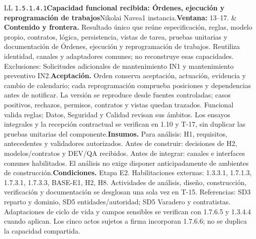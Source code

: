 \begin{longtable}{L{\tabcolsep\relax}L{\tabcolsep\relax}}
\texttt{1.\allowbreak{}5.\allowbreak{}1.\allowbreak{}4.\allowbreak{}1}\newline{}\textbf{Capacidad funcional recibida: Órdenes, ejecución y reprogramación de trabajos}\newline{}Nikolai Navea\newline{}1 instancia.\newline{}\textbf{Ventana:} 13--17. & \textbf{Contenido y frontera.} Resultado único que reúne especificación, reglas, modelo propio, contratos, lógica, persistencia, vistas de tarea, pruebas unitarias y documentación de Órdenes, ejecución y reprogramación de trabajos. Reutiliza identidad, canales y adaptadores comunes; no reconstruye esas capacidades. Exclusiones: Solicitudes adicionales de mantenimiento IN1 y mantenimiento preventivo IN2.\newline{}\textbf{Aceptación.} Orden conserva aceptación, actuación, evidencia y cambio de calendario; cada reprogramación comprueba posiciones y dependencias antes de notificar. La versión se reproduce desde fuentes controladas; casos positivos, rechazos, permisos, contratos y vistas quedan trazados. Funcional valida reglas; Datos, Seguridad y Calidad revisan sus ámbitos. Los ensayos integrales y la recepción contractual se verifican en 1.10 y T-17, sin duplicar las pruebas unitarias del componente.\newline{}\textbf{Insumos.} Para análisis: H1, requisitos, antecedentes y validadores autorizados. Antes de construir: decisiones de H2, modelos/contratos y DEV/QA recibidos. Antes de integrar: canales e interfaces comunes habilitados. El análisis no exige disponer anticipadamente de ambientes de construcción.\newline{}\textbf{Condiciones.} Etapa E2. Habilitaciones externas: 1.3.3.1, 1.7.1.3, 1.7.3.1, 1.7.3.3, BASE-E1, H2, H8. Actividades de análisis, diseño, construcción, verificación y documentación se desglosan una sola vez en T-15. Referencias: SD3 reparto y dominio, SD5 entidades/autoridad; SD5 Varadero y contratistas. Adaptaciones de ciclo de vida y campos sensibles se verifican con 1.7.6.5 y 1.3.4.4 cuando aplican. Los cinco actos sujetos a firma incorporan 1.7.6.6; no se duplica la capacidad compartida.\\\hline

\end{longtable}
